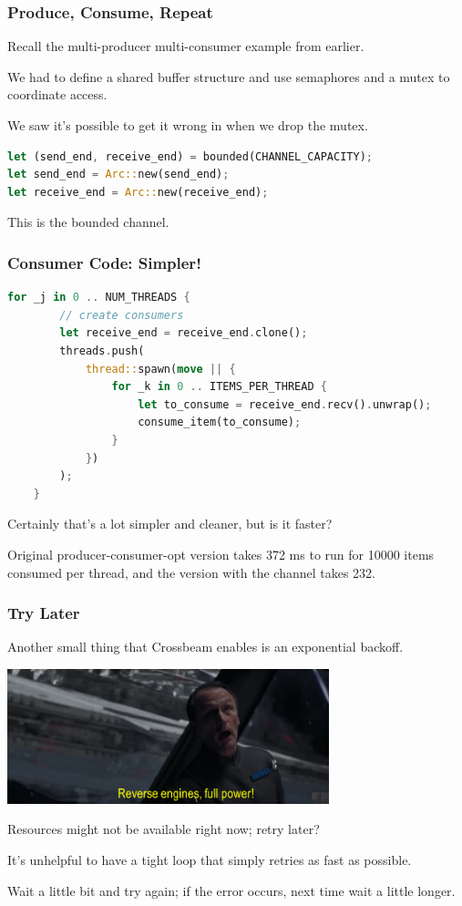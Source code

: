\begin{frame}[fragile]
\frametitle{Produce, Consume, Repeat}

Recall the multi-producer multi-consumer example from earlier. 

We had to define a shared buffer structure and use semaphores and a mutex to coordinate access.

We saw it's possible to get it wrong in when we drop the mutex.

\begin{lstlisting}[language=Rust]
let (send_end, receive_end) = bounded(CHANNEL_CAPACITY);
let send_end = Arc::new(send_end);
let receive_end = Arc::new(receive_end);
\end{lstlisting}

This is the bounded channel.

\end{frame}


\begin{frame}[fragile]
\frametitle{Consumer Code: Simpler!}

\begin{lstlisting}[language=Rust]
    for _j in 0 .. NUM_THREADS {
        // create consumers
        let receive_end = receive_end.clone();
        threads.push(
            thread::spawn(move || {
                for _k in 0 .. ITEMS_PER_THREAD {
                    let to_consume = receive_end.recv().unwrap();
                    consume_item(to_consume);
                }
            })
        );
    }
\end{lstlisting}

Certainly that's a lot simpler and cleaner, but is it faster? 

Original producer-consumer-opt version takes 372 ms to run for 10000 items consumed per thread, and the version with the channel takes 232. 

\end{frame}


\begin{frame}
\frametitle{Try Later}

Another small thing that Crossbeam enables is an exponential backoff.

\begin{center}
	\includegraphics[width=0.7\textwidth]{images/reverse.png}
\end{center}

Resources might not be available right now; retry later?

It's unhelpful to have a tight loop that simply retries as fast as possible. 

Wait a little bit and try again; if the error occurs, next time wait a little longer.

\end{frame}

